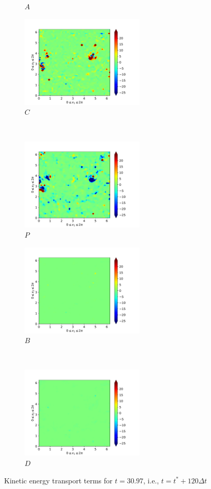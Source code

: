 \begin{figure}[H]
\begin{subfigure}{0.45\textwidth}
        \caption{$A$}
    \end{subfigure}
    \newline
    \begin{subfigure}{0.45\textwidth}
        \includegraphics[height=1.75in]{media/run-cds-65/C-ke-1460}
        \caption{$C$}
    \end{subfigure}
    ~
    \begin{subfigure}{0.45\textwidth}
        \includegraphics[height=1.75in]{media/run-cds-65/P-ke-1460}
        \caption{$P$}
    \end{subfigure}
    \newline
    \begin{subfigure}{0.45\textwidth}
        \includegraphics[height=1.75in]{media/run-cds-65/B-ke-1460}
        \caption{$B$}
    \end{subfigure}
    ~
    \begin{subfigure}{0.45\textwidth}
        \includegraphics[height=1.75in]{media/run-cds-65/D-ke-1460}
        \caption{$D$}
    \end{subfigure}
    \caption{Kinetic energy transport terms for $t=30.97$, i.e., $t=t^{\ast} + 120 \Delta t$}
\end{figure}
